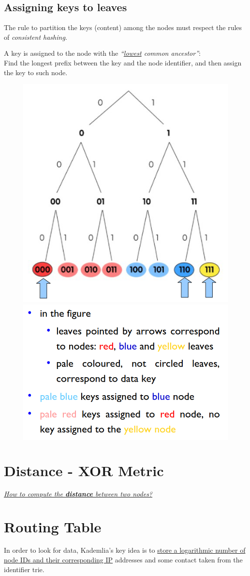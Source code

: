 \newpage
\subsection{Assigning keys to leaves}
The rule to partition the keys (content) among the nodes must respect the rules of \textit{consistent hashing}.

\begin{paracol}{2}
   \colfill
   \begin{definition}
      A key is assigned to the node with the
      \textit{``\ul{lowest} common ancestor''}:\\
      Find the longest prefix between the
      key and the node identifier, and then assign the key to such node.
   \end{definition}
   \colfill
   \switchcolumn
   \begin{figure}[htbp]
      \centering
      \includegraphics[width=0.45\columnwidth]{images/kademlia_leaves01.png}
      \includegraphics[width=0.45\columnwidth]{images/kademlia_leaves02.png}
      \label{fig:kademlia_leaves}
   \end{figure}
\end{paracol}

\section{Distance - XOR Metric}
\begin{center}
   \textit{\ul{How to compute the \textbf{distance} between two nodes?}}
\end{center}

\section{Routing Table}
In order to look for data, Kademlia's key idea is to \ul{store a logarithmic number of node IDs and their corresponding IP} addresses and some contact taken from the identifier trie.

